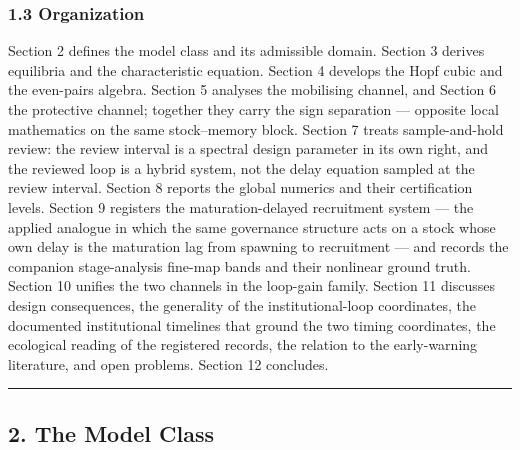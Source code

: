 \documentclass[11pt]{article}
\begin{document}
\subsubsection{1.3 Organization}\label{organization}

Section 2 defines the model class and its admissible domain. Section 3
derives equilibria and the characteristic equation. Section 4 develops
the Hopf cubic and the even-pairs algebra. Section 5 analyses the
mobilising channel, and Section 6 the protective channel; together they
carry the sign separation --- opposite local mathematics on the same
stock--memory block. Section 7 treats sample-and-hold review: the review
interval is a spectral design parameter in its own right, and the
reviewed loop is a hybrid system, not the delay equation sampled at the
review interval. Section 8 reports the global numerics and their
certification levels. Section 9 registers the maturation-delayed
recruitment system --- the applied analogue in which the same governance
structure acts on a stock whose own delay is the maturation lag from
spawning to recruitment --- and records the companion stage-analysis
fine-map bands and their nonlinear ground truth. Section 10 unifies the
two channels in the loop-gain family. Section 11 discusses design
consequences, the generality of the institutional-loop coordinates, the
documented institutional timelines that ground the two timing
coordinates, the ecological reading of the registered records, the
relation to the early-warning literature, and open problems. Section 12
concludes.

\begin{center}\rule{0.5\linewidth}{0.5pt}\end{center}

\subsection{2. The Model Class}\label{the-model-class}
\end{document}
